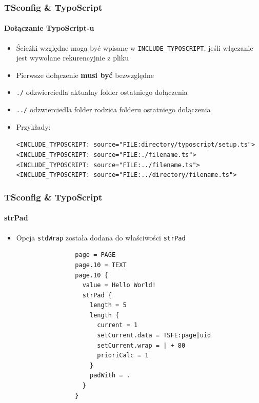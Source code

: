
\begin{frame}[fragile]
	\frametitle{TSconfig \& TypoScript}
	\framesubtitle{Dołączanie TypoScript-u}

	\begin{itemize}
		\item Ścieżki względne mogą być wpisane w \texttt{INCLUDE\_TYPOSCRIPT},\newline
			jeśli włączanie jest wywołane rekurencyjnie z pliku
		\item Pierwsze dołączenie \textbf{musi być} bezwzględne
		\item \texttt{./} odzwierciedla aktualny folder ostatniego dołączenia
		\item \texttt{../} odzwierciedla folder rodzica folderu ostatniego dołączenia
		\item Przykłady:

			\lstinline!<INCLUDE_TYPOSCRIPT: source="FILE:directory/typoscript/setup.ts">!
			\lstinline!<INCLUDE_TYPOSCRIPT: source="FILE:./filename.ts">!
			\lstinline!<INCLUDE_TYPOSCRIPT: source="FILE:../filename.ts">!
			\lstinline!<INCLUDE_TYPOSCRIPT: source="FILE:../directory/filename.ts">!

	\end{itemize}

\end{frame}


\begin{frame}[fragile]
	\frametitle{TSconfig \& TypoScript}
	\framesubtitle{strPad}

	\begin{itemize}
		\item Opcja \texttt{stdWrap} została dodana do właściwości \texttt{strPad} 

			\begin{lstlisting}
				page = PAGE
				page.10 = TEXT
				page.10 {
				  value = Hello World!
				  strPad {
				    length = 5
				    length {
				      current = 1
				      setCurrent.data = TSFE:page|uid
				      setCurrent.wrap = | + 80
				      prioriCalc = 1
				    }
				    padWith = .
				  }
				}
			\end{lstlisting}

	\end{itemize}

\end{frame}

